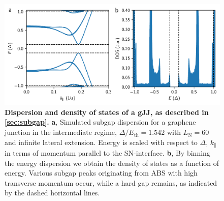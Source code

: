 \begin{figure}[]
	\centering
	\includegraphics[width=\linewidth]{chapter-gJJ/figs/si_subgap_dos}
	\caption{{\bf Dispersion and density of states of a gJJ, as described in \ref{sec:subgap}.}
		{\bf a}, Simulated subgap dispersion for a graphene junction in the intermediate regime, $\Delta/E_\text{th}=1.542$ with $L_\text{N}=60$ and infinite lateral extension.
		Energy is scaled with respect to $\Delta$, $k_\parallel$ in terms of momentum parallel to the SN-interface.
		{\bf b}, By binning the energy dispersion we obtain the density of states as a function of energy.
		Various subgap peaks originating from ABS with high transverse momentum occur, while a hard gap remains, as indicated by the dashed horizontal lines.
	}
	\label{fig:subgap_dos}
\end{figure}


